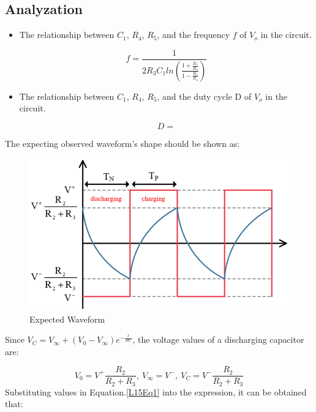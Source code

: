     \subsection{Analyzation}
        \begin{itemize}
            \item The relationship between $C_1$, $R_4$, $R_5$, and the frequency $f$ of $V_o$ in the circuit.\par
            \begin{equation}
                f = \frac{1}{2R_3C_1ln(\frac{1+\frac{R_5}{R_4}}{1-\frac{R_5}{R_4}})}
            \end{equation}
            \FloatBarrier
            
            \item The relationship between $C_1$, $R_4$, $R_5$, and the duty cycle D of $V_o$ in the circuit.\par
            \begin{equation}
                D = 
            \end{equation}
        \end{itemize}
    \FloatBarrier
    The expecting observed waveform's shape should be shown as:\par
    \begin{figure}[h]
        \centering
        \includegraphics[width=0.75\linewidth]{Lab15/ExWF.png}
        \caption{Expected Waveform}
        \label{L15ExWF}
    \end{figure}
    \FloatBarrier
    Since $V_C=V_\infty+(V_0-V_\infty)e^{-\frac{t}{RC}}$, the voltage values of a discharging capacitor are:\par
    \begin{equation}
        V_0=V^+\frac{R_2}{R_2+R_3},~V_\infty=V^-,~V_C=V^-\frac{R_2}{R_2+R_3}
    \label{L15Eq1}
    \end{equation}
    \FloatBarrier
    Substituting values in Equation.\ref{L15Eq1} into the expression, it can be obtained that:\par
